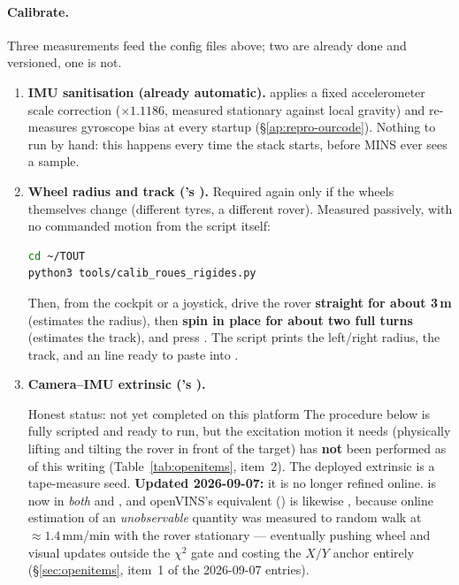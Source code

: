 \paragraph{Calibrate.}
Three measurements feed the config files above; two are already done and
versioned, one is not.
\begin{enumerate}[leftmargin=1.4em]
\item \textbf{IMU sanitisation (already automatic).} 
  applies a fixed accelerometer scale correction ($\times 1.1186$, measured
  stationary against local gravity) and re-measures gyroscope bias at every
  startup (\S\ref{ap:repro-ourcode}). Nothing to run by hand: this happens
  every time the stack starts, before MINS ever sees a sample.
\item \textbf{Wheel radius and track ('s
  ).} Required again only if the wheels themselves change
  (different tyres, a different rover). Measured passively, with no commanded
  motion from the script itself:
\begin{lstlisting}[language=bash]
cd ~/TOUT
python3 tools/calib_roues_rigides.py
\end{lstlisting}
  Then, from the cockpit or a joystick, drive the rover \textbf{straight for
  about 3\,m} (estimates the radius), then \textbf{spin in place for about
  two full turns} (estimates the track), and press . The script
  prints the left/right radius, the track, and an  line
  ready to paste into .
\item \textbf{Camera--IMU extrinsic ('s
  ).}
\begin{trapbox}{Honest status: not yet completed on this platform}
The procedure below is fully scripted and ready to run, but the excitation
motion it needs (physically lifting and tilting the rover in front of the
target) has \textbf{not} been performed as of this writing
(Table~\ref{tab:openitems}, item~2). The deployed extrinsic is a
tape-measure seed. \textbf{Updated 2026-09-07:} it is no longer refined
online.  is now  in \emph{both}
 and , and openVINS's
equivalent () is likewise , because
online estimation of an \emph{unobservable} quantity was measured to random
walk at ${\approx}1.4$\,mm/min with the rover stationary --- eventually
pushing wheel and visual updates outside the $\chi^2$ gate and costing the
$X/Y$ anchor entirely (\S\ref{sec:openitems}, item~1 of the 2026-09-07
entries).


\end{trapbox}
\end{enumerate}

